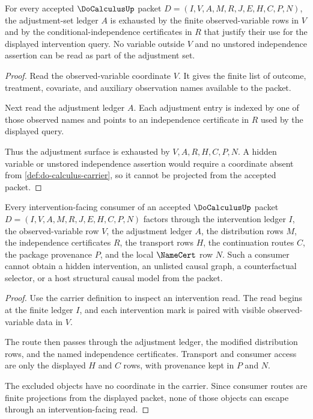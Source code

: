 \begin{theorem}
\label{thm:do-calculus-adjustment-ledger}
For every accepted $\DoCalculusUp$ packet $D=(I,V,A,M,R,J,E,H,C,P,N)$, the
adjustment-set ledger $A$ is exhausted by the finite observed-variable rows in
$V$ and by the conditional-independence certificates in $R$ that justify their
use for the displayed intervention query. No variable outside $V$ and no
unstored independence assertion can be read as part of the adjustment set.
\end{theorem}
\begin{proof}
Read the observed-variable coordinate $V$. It gives the finite list of
outcome, treatment, covariate, and auxiliary observation names available to the
packet.

Next read the adjustment ledger $A$. Each adjustment entry is indexed by one of
those observed names and points to an independence certificate in $R$ used by
the displayed query.

Thus the adjustment surface is exhausted by $V,A,R,H,C,P,N$. A hidden variable
or unstored independence assertion would require a coordinate absent from
\autoref{def:do-calculus-carrier}, so it cannot be projected from the accepted
packet.
\end{proof}

\begin{theorem}
\label{thm:do-calculus-intervention-non-escape}
Every intervention-facing consumer of an accepted $\DoCalculusUp$ packet
$D=(I,V,A,M,R,J,E,H,C,P,N)$ factors through the intervention ledger $I$, the
observed-variable row $V$, the adjustment ledger $A$, the distribution rows
$M$, the independence certificates $R$, the transport rows $H$, the
continuation routes $C$, the package provenance $P$, and the local
$\NameCert$ row $N$. Such a consumer cannot obtain a hidden intervention, an
unlisted causal graph, a counterfactual selector, or a host structural causal
model from the packet.
\end{theorem}
\begin{proof}
Use the carrier definition to inspect an intervention read. The read begins at
the finite ledger $I$, and each intervention mark is paired with visible
observed-variable data in $V$.

The route then passes through the adjustment ledger, the modified distribution
rows, and the named independence certificates. Transport and consumer access
are only the displayed $H$ and $C$ rows, with provenance kept in $P$ and $N$.

The excluded objects have no coordinate in the carrier. Since consumer routes
are finite projections from the displayed packet, none of those objects can
escape through an intervention-facing read.
\end{proof}

